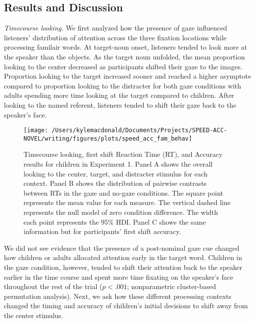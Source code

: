 \documentclass[man,floatsintext]{apa6}
\begin{document}
\subsection{Results and Discussion}\label{results-and-discussion}

\emph{Timecourse looking.} We first analyzed how the presence of gaze
influenced listeners' distribution of attention across the three
fixation locations while processing familair words. At target-noun
onset, listeners tended to look more at the speaker than the objects. As
the target noun unfolded, the mean proportion looking to the center
decreased as participants shifted their gaze to the images. Proportion
looking to the target increased sooner and reached a higher asymptote
compared to proportion looking to the distracter for both gaze
conditions with adults spending more time looking at the target compared
to children. After looking to the named referent, listeners tended to
shift their gaze back to the speaker's face.

\begin{figure}[!t]

{\centering \texttt{[image: /Users/kylemacdonald/Documents/Projects/SPEED-ACC-NOVEL/writing/figures/plots/speed\_acc\_fam\_behav]} 

}

\caption{Timecourse looking, first shift Reaction Time (RT), and Accuracy results for children in Experiment 1. Panel A shows the overall looking to the center, target, and distracter stimulus for each context. Panel B shows the distribution of pairwise contrasts between RTs in the gaze and no-gaze conditions. The square point represents the mean value for each measure. The vertical dashed line represents the null model of zero condition difference. The width each point represents the 95\% HDI. Panel C shows the same information but for participants' first shift accuracy.}\label{fig:speed-acc-gaze-results}
\end{figure}

We did not see evidence that the presence of a post-nominal gaze cue
changed how children or adults allocated attention early in the target
word. Children in the gaze condition, however, tended to shift their
attention back to the speaker earlier in the time course and spent more
time fixating on the speaker's face throughout the rest of the trial
(\(p < .001\); nonparametric cluster-based permutation analysis). Next,
we ask how these different processing contexts changed the timing and
accuracy of children's initial decisions to shift away from the center
stimulus.
\end{document}
